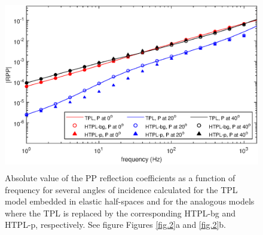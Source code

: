 \documentclass[draft]{agujournal2019}
\begin{document}
%
\begin{figure}[!ht]
\centering
        \includegraphics[width= 120mm, height=75mm]{rpp_2sandshale.eps}
\caption{ Absolute value of the PP reflection coefficients as a function of frequency for several angles of incidence calculated for the TPL model embedded in elastic half-spaces and for the analogous models where the TPL is replaced by the corresponding HTPL-bg and HTPL-p, respectively. See figure Figures \ref{fig.2}a and \ref{fig.2}b.}
\label{fig.4}
\end{figure}
\end{document}
